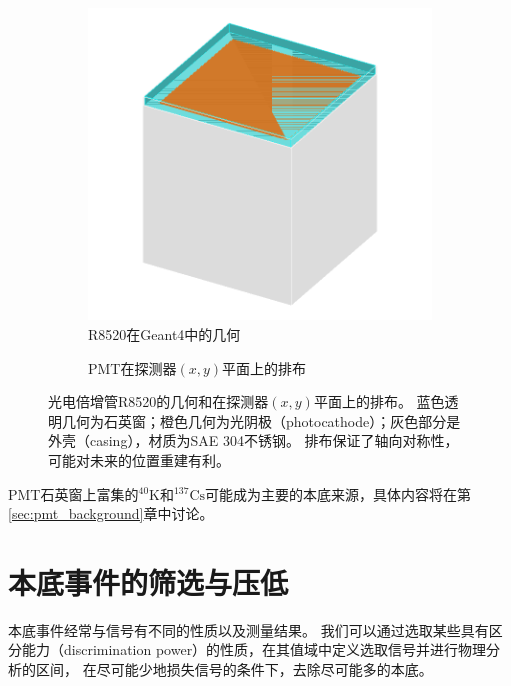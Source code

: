 \begin{figure}
  \begin{subfigure}{.5\textwidth}
    \centering
    \includegraphics[width=1.0\linewidth]{figures/pmt_geo.png}
    \caption{\label{fig:pmt_g4} R8520在Geant4中的几何}
  \end{subfigure}
  \begin{subfigure}{.5\textwidth}
    \centering
    
    \caption{\label{fig:pmt_layout} PMT在探测器$(x,y)$平面上的排布}
  \end{subfigure}
  \caption{\label{fig:pmt_geo} 光电倍增管R8520的几何和在探测器$(x,y)$平面上的排布。
  蓝色透明几何为石英窗；橙色几何为光阴极（photocathode）；灰色部分是外壳（casing），材质为SAE 304不锈钢。
  排布保证了轴向对称性，可能对未来的位置重建有利。}
\end{figure}

PMT石英窗上富集的${}^{40}\mathrm{K}$和${}^{137}\mathrm{Cs}$可能成为主要的本底来源，具体内容将在第\ref{sec:pmt_background}章中讨论。

\section{本底事件的筛选与压低}

本底事件经常与信号有不同的性质以及测量结果。
我们可以通过选取某些具有区分能力（discrimination power）的性质，在其值域中定义选取信号并进行物理分析的区间，
在尽可能少地损失信号的条件下，去除尽可能多的本底。

